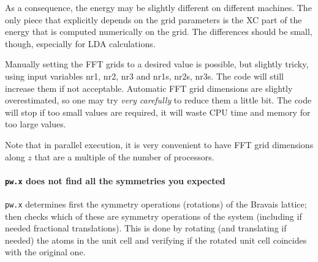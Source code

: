 \documentclass[12pt,a4paper]{article}
\def\pw.x{\texttt{pw.x}}
\begin{document}
As a consequence, the energy may be slightly different on different machines. 
The only piece that explicitly depends on the grid parameters is
the XC part of the energy that is computed numerically on the grid. The
differences should be small, though, especially for LDA calculations.

Manually setting the FFT grids to a desired value is possible, but slightly
tricky, using input variables nr1, nr2, nr3 and nr1s, nr2s, nr3s. The
code will still increase them if not acceptable. Automatic FFT grid 
dimensions are slightly overestimated, so one may try {\em very carefully}
to reduce
them a little bit. The code will stop if too small values are required, it will
waste CPU time and memory for too large values.
    
Note that in parallel execution, it is very convenient to have FFT grid
dimensions along $z$ that are a multiple of the number of processors.

\paragraph{\pw.x does not find all the symmetries you expected} 
\pw.x determines first the symmetry operations (rotations) of the
Bravais lattice; then checks which of these are symmetry operations of
the system (including if needed fractional translations). This is done
by rotating (and translating if needed) the atoms in the unit cell and
verifying if the rotated unit cell coincides with the original one.
\end{document}
